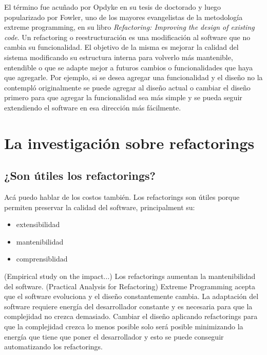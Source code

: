 El término fue acuñado por Opdyke en su tesis de doctorado y luego popularizado por Fowler, uno de
los mayores evangelistas de la metodología extreme programming, en su libro \textit{Refactoring:
Improving the design of existing code}. Un refactoring o reestructuración es una modificación al
software que no cambia su funcionalidad. El objetivo de la misma es mejorar la calidad del sistema
modificando su estructura interna para volverlo más mantenible, entendible o que se adapte mejor a
futuros cambios o funcionalidades que haya que agregarle. Por ejemplo, si se desea agregar una
funcionalidad y el diseño no la contempló originalmente se puede agregar al diseño actual o cambiar
el diseño primero para que agregar la funcionalidad sea más simple y se pueda seguir extendiendo el
software en esa dirección más fácilmente.













\section{La investigación sobre refactorings}

\subsection{¿Son útiles los refactorings?}
Acá puedo hablar de los costos también.
Los refactorings son útiles porque permiten preservar la calidad del software, principalment su:

\begin{itemize}
    \item extensibilidad
    \item mantenibilidad
    \item comprensiblidad
\end{itemize}

(Empirical study on the impact...)
Los refactorings aumentan la mantenibilidad del software.
(Practical Analysis for Refactoring)
Extreme Programming acepta que el software evoluciona y el diseño constantemente cambia. La
adaptación del software requiere energía del desarrollador constante y es necesaria para que la
complejidad no crezca demasiado. Cambiar el diseño aplicando refactorings para que la complejidad
crezca lo menos posible solo será posible minimizando la energía que tiene que poner el
desarrollador y esto se puede conseguir automatizando los refactorings.

